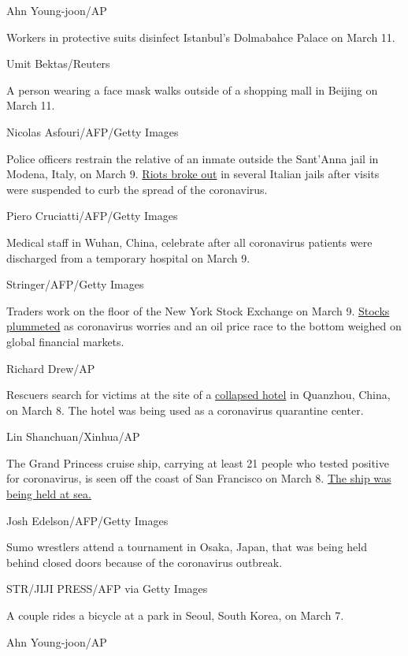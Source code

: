 Ahn Young-joon/AP

Workers in protective suits disinfect Istanbul's Dolmabahce Palace on
March 11.

Umit Bektas/Reuters

A person wearing a face mask walks outside of a shopping mall in Beijing
on March 11.

Nicolas Asfouri/AFP/Getty Images

Police officers restrain the relative of an inmate outside the Sant'Anna
jail in Modena, Italy, on March 9.
\href{https://www.cnn.com/asia/live-news/coronavirus-outbreak-03-09-20-intl-hnk/h_950c62671e245816c223fb84f1306fe6}{Riots
broke out} in several Italian jails after visits were suspended to curb
the spread of the coronavirus.

Piero Cruciatti/AFP/Getty Images

Medical staff in Wuhan, China, celebrate after all coronavirus patients
were discharged from a temporary hospital on March 9.

Stringer/AFP/Getty Images

Traders work on the floor of the New York Stock Exchange on March 9.
\href{https://www.cnn.com/2020/03/08/investing/stock-dow-futures-coronavirus/index.html}{Stocks
plummeted} as coronavirus worries and an oil price race to the bottom
weighed on global financial markets.

Richard Drew/AP

Rescuers search for victims at the site of a
\href{https://www.cnn.com/2020/03/07/china/china-coronavirus-hotel-collapse/index.html}{collapsed
hotel} in Quanzhou, China, on March 8. The hotel was being used as a
coronavirus quarantine center.

Lin Shanchuan/Xinhua/AP

The Grand Princess cruise ship, carrying at least 21 people who tested
positive for coronavirus, is seen off the coast of San Francisco on
March 8.
\href{https://www.cnn.com/2020/03/09/health/us-coronavirus-monday/index.html}{The
ship was being held at sea.}

Josh Edelson/AFP/Getty Images

Sumo wrestlers attend a tournament in Osaka, Japan, that was being held
behind closed doors because of the coronavirus outbreak.

STR/JIJI PRESS/AFP via Getty Images

A couple rides a bicycle at a park in Seoul, South Korea, on March 7.

Ahn Young-joon/AP

